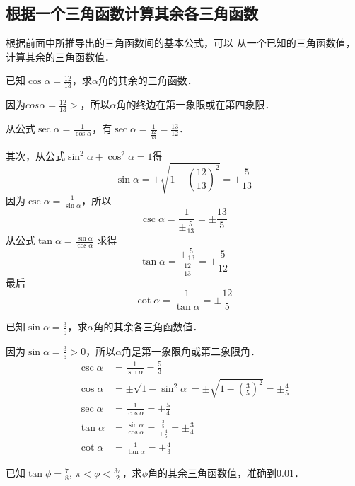 \subsection{根据一个三角函数计算其余各三角函数}
根据前面中所推导出的三角函数间的基本公式，可以
从一个已知的三角函数值，计算其余的三角函数值．

\begin{example}
已知$\cos\alpha=\frac{12}{13}$，求$\alpha$角的其余的三角函数．
\end{example}

\begin{solution}
因为$cos\alpha=\frac{12}{13}>$，所以$\alpha$角的终边在第一象限或在第四象限．

从公式$\sec\alpha=\frac{1}{\cos\alpha}$，有$\sec\alpha=\frac{1}{\frac{12}{13}}=\frac{13}{12}$．

其次，从公式$\sin^2\alpha+\cos^2\alpha=1$得
\[\sin\alpha=\pm\sqrt{1-\left(\frac{12}{13}\right)^2}=\pm\frac{5}{13}\]
因为$\csc\alpha=\frac{1}{\sin\alpha}$，所以
\[\csc\alpha=\frac{1}{\pm\frac{5}{13}}=\pm\frac{13}{5}\]
从公式$\tan\alpha=\frac{\sin\alpha}{\cos\alpha}$
求得
\[\tan\alpha=\frac{\pm\frac{5}{13}}{\frac{12}{13}}=\pm\frac{5}{12}\]
最后
\[\cot\alpha=\frac{1}{\tan\alpha}=\pm\frac{12}{5}\]
\end{solution}


\begin{example}
    已知$\sin\alpha=\frac{3}{5}$，求$\alpha$角的其余各三角函数值．
\end{example}
    
\begin{solution}
    因为$\sin\alpha=\frac{3}{5}>0$，所以$\alpha$角是第一象限角或第二象限角．
\[\begin{split}
    \csc\alpha&=\frac{1}{\sin\alpha}=\frac{5}{3}\\
    \cos\alpha&=\pm\sqrt{1-\sin^2\alpha}=\pm\sqrt{1-\left(\frac{3}{5}\right)^2}=\pm\frac{4}{5}\\
    \sec\alpha&=\frac{1}{\cos\alpha}=\pm\frac{5}{4}\\
    \tan\alpha&=\frac{\sin\alpha}{\cos\alpha}=\frac{\frac{3}{5}}{\pm\frac{4}{5}}=\pm\frac{3}{4}\\
    \cot\alpha&=\frac{1}{\tan\alpha}=\pm\frac{4}{3}
\end{split}\]
\end{solution}

\begin{example}
已知$\tan\phi=\frac{7}{8}$, $\pi<\phi<\frac{3\pi}{2}$，求$\phi$角的其余三角函数值，准确到0.01．
\end{example}

